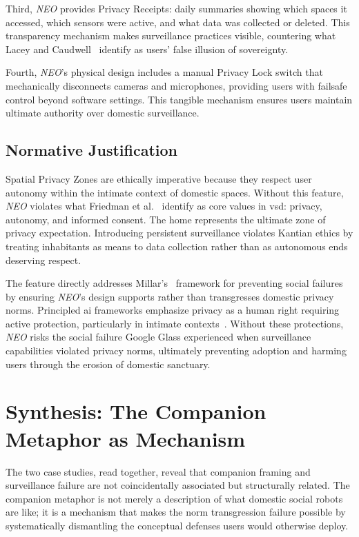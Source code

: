 \documentclass{ieee-portfolio}
\newcommand{\neo}{\textit{NEO}}
\begin{document}
Third, \neo{} provides Privacy Receipts: daily summaries showing which spaces it accessed, which sensors were active, and what data was collected or deleted. This transparency mechanism makes surveillance practices visible, countering what Lacey and Caudwell~\cite{lacey_cuteness_2019} identify as users' false illusion of sovereignty.

Fourth, \neo{}'s physical design includes a manual Privacy Lock switch that mechanically disconnects cameras and microphones, providing users with failsafe control beyond software settings. This tangible mechanism ensures users maintain ultimate authority over domestic surveillance.

\subsection{Normative Justification}

Spatial Privacy Zones are ethically imperative because they respect user autonomy within the intimate context of domestic spaces. Without this feature, \neo{} violates what Friedman et al.~\cite{friedman_value_2013} identify as core values in \gls{vsd}: privacy, autonomy, and informed consent. The home represents the ultimate zone of privacy expectation. Introducing persistent surveillance violates Kantian ethics by treating inhabitants as means to data collection rather than as autonomous ends deserving respect.

The feature directly addresses Millar's~\cite{millar_social_2020} framework for preventing social failures by ensuring \neo{}'s design supports rather than transgresses domestic privacy norms. Principled \gls{ai} frameworks emphasize privacy as a human right requiring active protection, particularly in intimate contexts~\cite{fjeld_principled_2020}. Without these protections, \neo{} risks the social failure Google Glass experienced when surveillance capabilities violated privacy norms, ultimately preventing adoption and harming users through the erosion of domestic sanctuary.

\section{Synthesis: The Companion Metaphor as Mechanism}
\label{sec:synthesis}

The two case studies, read together, reveal that companion framing and surveillance failure are not coincidentally associated but structurally related. The companion metaphor is not merely a description of what domestic social robots are like; it is a mechanism that makes the norm transgression failure possible by systematically dismantling the conceptual defenses users would otherwise deploy.
\end{document}
